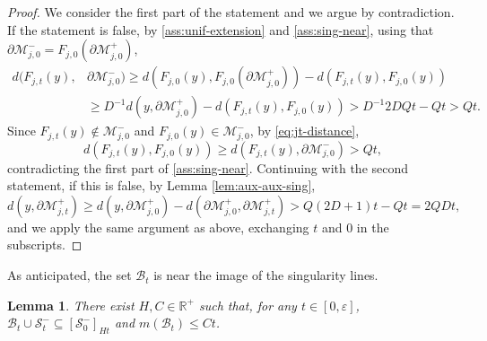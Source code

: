 \documentclass{amsart}
\numberwithin{equation}{section}
\newtheorem{lemma}[theorem]{Lemma}
\newcommand\ve{\varepsilon}
\renewcommand{\ge}{\geqslant}
\renewcommand{\le}{\leqslant}
\newcommand\cB{{\mathcal B}}
\newcommand\cM{{\mathcal M}}
\newcommand\cS{{\mathcal S}}
\newcommand\bR{{\mathbb R}}
\begin{document}
\begin{proof}
We consider the first part of the statement and we argue by contradiction. If the statement is false, by \ref{ass:unif-extension} and  \ref{ass:sing-near}, using that \(\partial \cM_{j,0}^{-} = F_{j,0}(\partial \cM_{j,0}^+)\),
\begin{equation}\label{eq:jt-distance}
\begin{split}
    d(F_{j,t}(y),& \partial \cM_{j,0}^{-}) \ge d(F_{j,0}(y), F_{j,0}(\partial \cM_{j,0}^{+})) - d(F_{j,t}(y), F_{j,0}(y)) \\
&\ge D^{-1} d (y, \partial \cM_{j,0}^{+}) - d(F_{j,t}(y), F_{j,0}(y)) > D^{-1}2DQt - Qt > Qt.  
\end{split}
\end{equation}
Since \(F_{j,t}(y) \not \in \cM_{j,0}^{-}\) and \(F_{j,0}(y) \in \cM_{j,0}^{-}\), by \eqref{eq:jt-distance}, 
\[
d(F_{j,t}(y), F_{j,0}(y)) \ge d(F_{j,t}(y), \partial \cM_{j,0}^{-})  > Qt,
\] 
contradicting the first part of \ref{ass:sing-near}. Continuing with the second statement, if this is false, by Lemma \ref{lem:aux-aux-sing},
\[
d(y, \partial \cM_{j,t}^{+}) \ge d(y, \partial \cM_{j,0}^{+}) - d(\partial \cM_{j,0}^{+}, \partial \cM_{j,t}^{+}) > Q(2D +1)t - Qt = 2QDt,
\]
and we apply the same argument as above, exchanging \(t\) and \(0\) in the subscripts.
\end{proof}
As anticipated, the set \(\cB_t\) is near the image of the singularity lines.
\begin{lemma}\label{lem:meas-bad-set}
There exist \(H, C \in \bR^+\) such that, for any \(t \in [0, \ve]\), \(\cB_t \cup \cS_t^{-}\subseteq [\cS_0^{-}]_{Ht}\) and \(
m \left( \cB_t \right) \le C t\).
\end{lemma}
\end{document}
